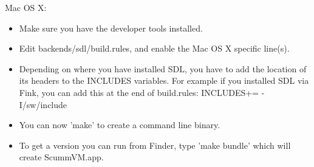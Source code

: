 Mac OS X:
\begin{itemize}
\item Make sure you have the developer tools installed.
\item Edit backends/sdl/build.rules, and enable the Mac OS X specific 
      line(s).
\item Depending on where you have installed SDL, you have to add the
      location of its headers to the INCLUDES variables. For example if you
      installed SDL via Fink, you can add this at the end of build.rules:
      INCLUDES+= -I/sw/include
\item You can now 'make' to create a command line binary.
\item To get a version you can run from Finder, type 'make bundle' which
      will create ScummVM.app.
\end{itemize}